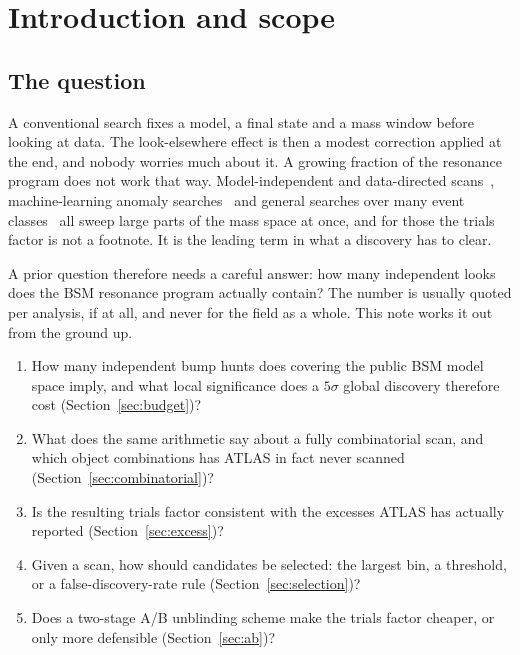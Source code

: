 \section{Introduction and scope}
\label{sec:intro}

\subsection{The question}

A conventional search fixes a model, a final state and a mass window before looking at data. The
look-elsewhere effect is then a modest correction applied at the end, and nobody worries much
about it. A growing fraction of the resonance program does not work that way. Model-independent
and data-directed scans~\cite{ddp}, machine-learning anomaly searches~\cite{atlas_ml_anomaly} and
general searches over many event classes~\cite{atlas_general_search} all sweep large parts of the
mass space at once, and for those the trials factor is not a footnote. It is the leading term in
what a discovery has to clear.

A prior question therefore needs a careful answer: how many independent looks does the BSM
resonance program actually contain? The number is usually quoted per analysis, if at all, and
never for the field as a whole. This note works it out from the ground up.

\begin{enumerate}[leftmargin=1.6em,itemsep=2pt]
  \item How many independent bump hunts does covering the public BSM model space imply, and what
        local significance does a $5\sigma$ global discovery therefore cost
        (Section~\ref{sec:budget})?
  \item What does the same arithmetic say about a fully combinatorial scan, and which object
        combinations has ATLAS in fact never scanned (Section~\ref{sec:combinatorial})?
  \item Is the resulting trials factor consistent with the excesses ATLAS has actually reported
        (Section~\ref{sec:excess})?
  \item Given a scan, how should candidates be selected: the largest bin, a threshold, or a
        false-discovery-rate rule (Section~\ref{sec:selection})?
  \item Does a two-stage A/B unblinding scheme make the trials factor cheaper, or only more
        defensible (Section~\ref{sec:ab})?
\end{enumerate}

